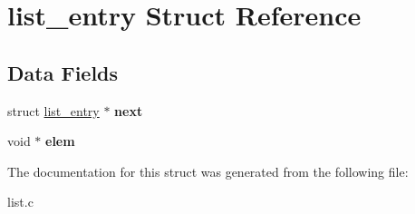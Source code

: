\hypertarget{structlist__entry}{}\section{list\+\_\+entry Struct Reference}
\label{structlist__entry}
\subsection*{Data Fields}
\begin{DoxyCompactItemize}
\item 
\hypertarget{structlist__entry_a0b1439db2d6f56fac7b7c87fb6261cb9}{}struct \hyperlink{structlist__entry}{list\+\_\+entry} $\ast$ {\bfseries next}\label{structlist__entry_a0b1439db2d6f56fac7b7c87fb6261cb9}

\item 
\hypertarget{structlist__entry_aef8d90be00f41efdd966b0afe76b1a89}{}void $\ast$ {\bfseries elem}\label{structlist__entry_aef8d90be00f41efdd966b0afe76b1a89}

\end{DoxyCompactItemize}


The documentation for this struct was generated from the following file\+:\begin{DoxyCompactItemize}
\item 
list.\+c\end{DoxyCompactItemize}
